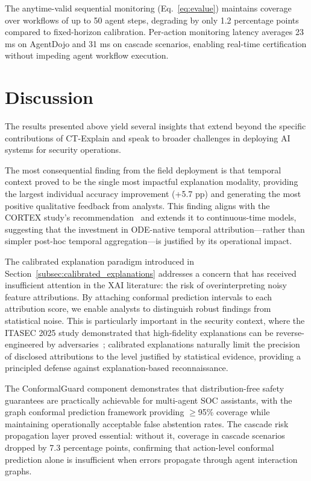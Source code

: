 \documentclass[preprint,review,12pt]{elsarticle}
\begin{document}
The anytime-valid sequential monitoring (Eq.~\ref{eq:evalue}) maintains coverage over workflows of up to 50 agent steps, degrading by only 1.2 percentage points compared to fixed-horizon calibration. Per-action monitoring latency averages 23 ms on AgentDojo and 31 ms on cascade scenarios, enabling real-time certification without impeding agent workflow execution.


\section{Discussion}
\label{sec:discussion}

The results presented above yield several insights that extend beyond the specific contributions of CT-Explain and speak to broader challenges in deploying AI systems for security operations.

The most consequential finding from the field deployment is that temporal context proved to be the single most impactful explanation modality, providing the largest individual accuracy improvement (+5.7 pp) and generating the most positive qualitative feedback from analysts. This finding aligns with the CORTEX study's recommendation~\cite{cortex2025} and extends it to continuous-time models, suggesting that the investment in ODE-native temporal attribution---rather than simpler post-hoc temporal aggregation---is justified by its operational impact.

The calibrated explanation paradigm introduced in Section~\ref{subsec:calibrated_explanations} addresses a concern that has received insufficient attention in the XAI literature: the risk of overinterpreting noisy feature attributions. By attaching conformal prediction intervals to each attribution score, we enable analysts to distinguish robust findings from statistical noise. This is particularly important in the security context, where the ITASEC 2025 study demonstrated that high-fidelity explanations can be reverse-engineered by adversaries~\cite{itasec_dual_use_2025}; calibrated explanations naturally limit the precision of disclosed attributions to the level justified by statistical evidence, providing a principled defense against explanation-based reconnaissance.

The ConformalGuard component demonstrates that distribution-free safety guarantees are practically achievable for multi-agent SOC assistants, with the graph conformal prediction framework providing $\geq$95\% coverage while maintaining operationally acceptable false abstention rates. The cascade risk propagation layer proved essential: without it, coverage in cascade scenarios dropped by 7.3 percentage points, confirming that action-level conformal prediction alone is insufficient when errors propagate through agent interaction graphs.
\end{document}
